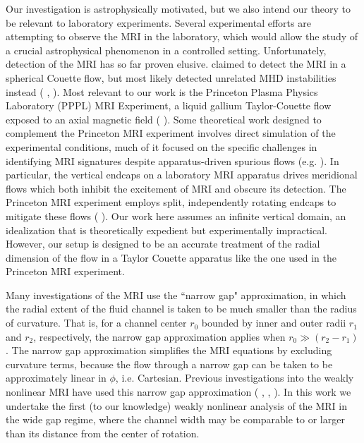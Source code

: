 \documentclass{emulateapj}
\newcommand{\citei}[1]{\citeauthor{#1} \citeyear{#1}}
\begin{document}
Our investigation is astrophysically motivated, but we also intend our theory to be relevant to laboratory experiments. Several experimental efforts are attempting to observe the MRI in the laboratory, which would allow the study of a crucial astrophysical phenomenon in a controlled setting. Unfortunately, detection of the MRI has so far proven elusive. \citei{Sisan:2004ig} claimed to detect the MRI in a spherical Couette flow, but most likely detected unrelated MHD instabilities instead (\citei{Hollerbach:2009ig}, \citei{Gissinger:2011td}). Most relevant to our work is the Princeton Plasma Physics Laboratory (PPPL) MRI Experiment, a liquid gallium Taylor-Couette flow exposed to an axial magnetic field (\citei{Ji:2001kd}). Some theoretical work designed to complement the Princeton MRI experiment involves direct simulation of the experimental conditions, much of it focused on the specific challenges in identifying MRI signatures despite apparatus-driven spurious flows (e.g. \citei{Gissinger:2012gc}). In particular, the vertical endcaps on a laboratory MRI apparatus drives meridional flows which both inhibit the excitement of MRI and obscure its detection. The Princeton MRI experiment employs split, independently rotating endcaps to mitigate these flows (\citei{Schartman:2009df}). Our work here assumes an infinite vertical domain, an idealization that is theoretically expedient but experimentally impractical. However, our setup is designed to be an accurate treatment of the radial dimension of the flow in a Taylor Couette apparatus like the one used in the Princeton MRI experiment. 

Many investigations of the MRI use the ``narrow gap" approximation, in which the radial extent of the fluid channel is taken to be much smaller than the radius of curvature. That is, for a channel center $r_0$ bounded by inner and outer radii $r_1$ and $r_2$, respectively, the narrow gap approximation applies when $r_0 \gg (r_2 - r_1)$. The narrow gap approximation simplifies the MRI equations by excluding curvature terms, because the flow through a narrow gap can be taken to be approximately linear in $\phi$, i.e. Cartesian. Previous investigations into the weakly nonlinear MRI have used this narrow gap approximation (\citei{Umurhan:2007dz}, \citei{Umurhan:2007hs}, \citei{Clark:2016}). In this work we undertake the first (to our knowledge) weakly nonlinear analysis of the MRI in the wide gap regime, where the channel width may be comparable to or larger than its distance from the center of rotation.
\end{document}
